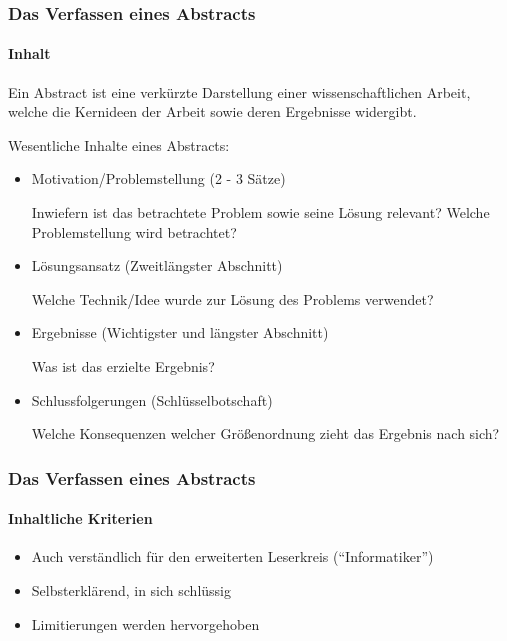 \documentclass{i20lecture}
\subtitle{Session 2}
\begin{document}
\frame{\titlepage}

\begin{frame}
  \frametitle{Das Verfassen eines Abstracts}
  \framesubtitle{Inhalt}

  Ein Abstract ist eine verkürzte Darstellung einer wissenschaftlichen Arbeit,
  welche die Kernideen der Arbeit sowie deren Ergebnisse widergibt.

  \medskip
  Wesentliche Inhalte eines Abstracts:
  \begin{itemize}
    \item Motivation/Problemstellung (2 - 3 Sätze)
    
    Inwiefern ist das betrachtete Problem sowie seine Lösung relevant? Welche
    Problemstellung wird betrachtet?

    \item Lösungsansatz (Zweitlängster Abschnitt)

    Welche Technik/Idee wurde zur Lösung des Problems verwendet?

    \item Ergebnisse (Wichtigster und längster Abschnitt)

    Was ist das erzielte Ergebnis?
    
    \item Schlussfolgerungen (Schlüsselbotschaft)

    Welche Konsequenzen welcher Größenordnung zieht das Ergebnis nach sich?

  \end{itemize}
\end{frame}

\begin{frame}
  \frametitle{Das Verfassen eines Abstracts}
  \framesubtitle{Inhaltliche Kriterien}
  
  \begin{itemize}
    \item Auch verständlich für den erweiterten Leserkreis (``Informatiker'')
    \item Selbsterklärend, in sich schlüssig
    \item Limitierungen werden hervorgehoben
  \end{itemize}

\end{frame}
\end{document}
